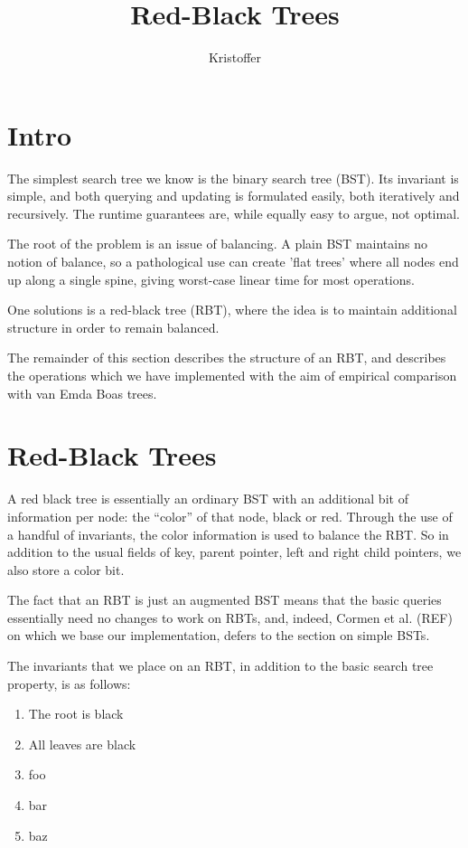 \documentclass[a4paper, 12pt]{article}
\title{Red-Black Trees}
\date{}
\author{Kristoffer}
\begin{document}
\maketitle
\section{Intro}
The simplest search tree we know is the binary search tree (BST). Its
invariant is simple, and both querying and updating is formulated
easily, both iteratively and recursively. The runtime guarantees are,
while equally easy to argue, not optimal.

The root of the problem is an issue of balancing. A plain BST
maintains no notion of balance, so a pathological use can create 'flat
trees' where all nodes end up along a single spine, giving worst-case
linear time for most operations.

One solutions is a red-black tree (RBT), where the idea is to maintain
additional structure in order to remain balanced.

The remainder of this section describes the structure of an RBT, and
describes the operations which we have implemented with the aim of
empirical comparison with van Emda Boas trees.

\section{Red-Black Trees}\label{sec:rbt}

A red black tree is essentially an ordinary BST with an additional bit
of information per node: the ``color'' of that node, black or
red. Through the use of a handful of invariants, the color information
is used to balance the RBT. So in addition to the usual fields of key,
parent pointer, left and right child pointers, we also store a color
bit.

The fact that an RBT is just an augmented BST means that the basic
queries essentially need no changes to work on RBTs, and, indeed,
Cormen et al. (REF) on which we base our implementation, defers to the
section on simple BSTs.

The invariants that we place on an RBT, in addition to the basic
search tree property, is as follows:

\begin{enumerate}
  \item The root is black
  \item All leaves are black
  \item foo 
  \item bar
  \item baz
\end{enumerate}
\end{document}
